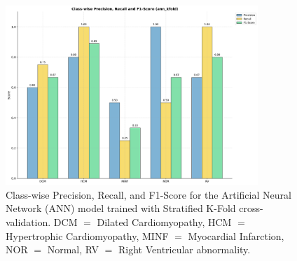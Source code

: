 \begin{figure}[H]
	\begin{center}
		\includegraphics[width=0.85\textwidth]{../images/metrics/ann/ann_kfold_class_wise_metrics.png}
	\end{center}
	\caption{Class-wise Precision, Recall, and F1-Score for the Artificial Neural
		Network (ANN) model trained with Stratified K-Fold cross-validation. DCM $=$
		Dilated Cardiomyopathy, HCM $=$ Hypertrophic Cardiomyopathy, MINF $=$
		Myocardial Infarction, NOR $=$ Normal, RV $=$ Right Ventricular abnormality.}
\end{figure}
